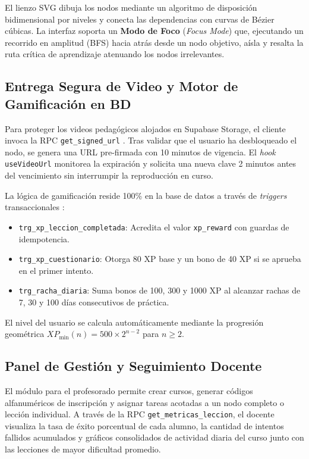 El lienzo SVG dibuja los nodos mediante un algoritmo de disposición bidimensional por niveles y conecta las dependencias con curvas de Bézier cúbicas. La interfaz soporta un \textbf{Modo de Foco} (\textit{Focus Mode}) que, ejecutando un recorrido en amplitud (BFS) hacia atrás desde un nodo objetivo, aísla y resalta la ruta crítica de aprendizaje atenuando los nodos irrelevantes.

\subsection{Entrega Segura de Video y Motor de Gamificación en BD}
Para proteger los videos pedagógicos alojados en Supabase Storage, el cliente invoca la RPC \texttt{get\_signed\_url} \cite{aws_presigned_2023, owasp_mobile_2023}. Tras validar que el usuario ha desbloqueado el nodo, se genera una URL pre-firmada con 10 minutos de vigencia. El \textit{hook} \texttt{useVideoUrl} monitorea la expiración y solicita una nueva clave 2 minutos antes del vencimiento sin interrumpir la reproducción en curso.

La lógica de gamificación reside 100\% en la base de datos a través de \textit{triggers} transaccionales \cite{deterding_game_2011, hamari_does_2014}:
\begin{itemize}
    \item \texttt{trg\_xp\_leccion\_completada}: Acredita el valor \texttt{xp\_reward} con guardas de idempotencia.
    \item \texttt{trg\_xp\_cuestionario}: Otorga 80 XP base y un bono de 40 XP si se aprueba en el primer intento.
    \item \texttt{trg\_racha\_diaria}: Suma bonos de 100, 300 y 1000 XP al alcanzar rachas de 7, 30 y 100 días consecutivos de práctica.
\end{itemize}
El nivel del usuario se calcula automáticamente mediante la progresión geométrica $XP_{\min}(n) = 500 \times 2^{n-2}$ para $n \ge 2$.

\subsection{Panel de Gestión y Seguimiento Docente}
El módulo para el profesorado permite crear cursos, generar códigos alfanuméricos de inscripción y asignar tareas acotadas a un nodo completo o lección individual. A través de la RPC \texttt{get\_metricas\_leccion}, el docente visualiza la tasa de éxito porcentual de cada alumno, la cantidad de intentos fallidos acumulados y gráficos consolidados de actividad diaria del curso junto con las lecciones de mayor dificultad promedio.
